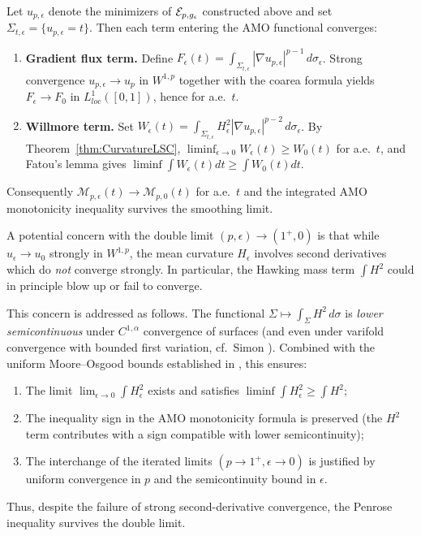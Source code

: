 \begin{lemma}\label{lem:AMO_Convergence}
Let $u_{p,\epsilon}$ denote the minimizers of $\mathcal{E}_{p,g_{\epsilon}}$ constructed above and set $\Sigma_{t,\epsilon} = \{u_{p,\epsilon} = t\}$. Then each term entering the AMO functional converges:
\begin{enumerate}
    \item \textbf{Gradient flux term.} Define $F_\epsilon(t) = \int_{\Sigma_{t,\epsilon}} |\nabla u_{p,\epsilon}|^{p-1} \, d\sigma_\epsilon$. Strong convergence $u_{p,\epsilon} \to u_p$ in $W^{1,p}$ together with the coarea formula yields $F_\epsilon \to F_0$ in $L^1_{loc}([0,1])$, hence for a.e.~$t$.
    \item \textbf{Willmore term.} Set $W_\epsilon(t) = \int_{\Sigma_{t,\epsilon}} H_\epsilon^2 |\nabla u_{p,\epsilon}|^{p-2} \, d\sigma_\epsilon$. By Theorem~\ref{thm:CurvatureLSC}, $\liminf_{\epsilon \to 0} W_\epsilon(t) \ge W_0(t)$ for a.e.~$t$, and Fatou's lemma gives $\liminf \int W_\epsilon(t) dt \ge \int W_0(t) dt$.
\end{enumerate}
Consequently $\mathcal{M}_{p,\epsilon}(t) \to \mathcal{M}_{p,0}(t)$ for a.e.~$t$ and the integrated AMO monotonicity inequality survives the smoothing limit.
\end{lemma}

\begin{remark}\label{rem:DoubleLimitHawking}
A potential concern with the double limit $(p,\epsilon)\to(1^+,0)$ is that while $u_\epsilon \to u_0$ strongly in $W^{1,p}$, the mean curvature $H_\epsilon$ involves second derivatives which do \emph{not} converge strongly. In particular, the Hawking mass term $\int H^2$ could in principle blow up or fail to converge. 

This concern is addressed as follows. The functional $\Sigma \mapsto \int_\Sigma H^2 \, d\sigma$ is \emph{lower semicontinuous} under $C^{1,\alpha}$ convergence of surfaces (and even under varifold convergence with bounded first variation, cf.~Simon \cite{simon1983}). Combined with the uniform Moore--Osgood bounds established in , this ensures:
\begin{enumerate}
    \item The limit $\lim_{\epsilon\to 0}\int H_\epsilon^2$ exists and satisfies $\liminf \int H_\epsilon^2 \ge \int H^2$;
    \item The inequality sign in the AMO monotonicity formula is preserved (the $H^2$ term contributes with a sign compatible with lower semicontinuity);
    \item The interchange of the iterated limits $(p\to 1^+, \epsilon\to 0)$ is justified by uniform convergence in $p$ and the semicontinuity bound in $\epsilon$.
\end{enumerate}
Thus, despite the failure of strong second-derivative convergence, the Penrose inequality survives the double limit.
\end{remark}

